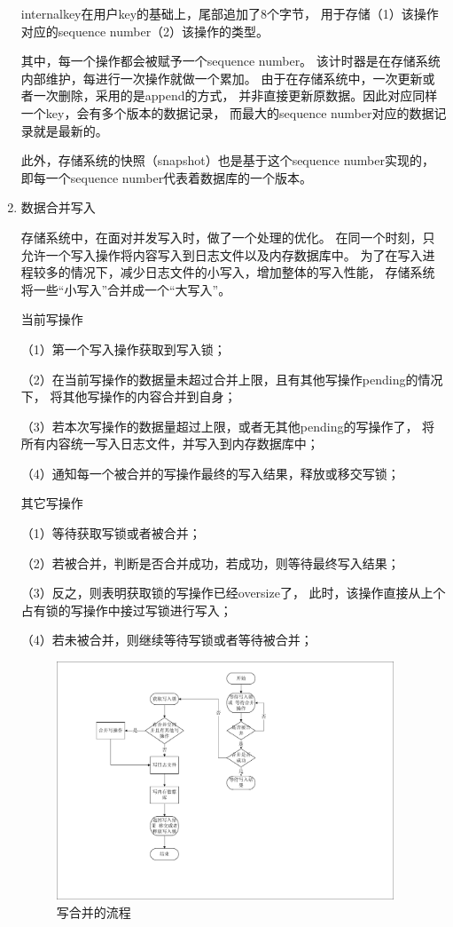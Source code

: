 \begin{enumerate}
		internalkey在用户key的基础上，尾部追加了8个字节，
		用于存储（1）该操作对应的sequence number（2）该操作的类型。

		其中，每一个操作都会被赋予一个sequence number。
		该计时器是在存储系统内部维护，每进行一次操作就做一个累加。
		由于在存储系统中，一次更新或者一次删除，采用的是append的方式，
		并非直接更新原数据。因此对应同样一个key，会有多个版本的数据记录，
		而最大的sequence number对应的数据记录就是最新的。

		此外，存储系统的快照（snapshot）也是基于这个sequence number实现的，
		即每一个sequence number代表着数据库的一个版本。

		\item 数据合并写入
		
		存储系统中，在面对并发写入时，做了一个处理的优化。
		在同一个时刻，只允许一个写入操作将内容写入到日志文件以及内存数据库中。
		为了在写入进程较多的情况下，减少日志文件的小写入，增加整体的写入性能，
		存储系统将一些“小写入”合并成一个“大写入”。

		当前写操作

		（1）第一个写入操作获取到写入锁；
		
		（2）在当前写操作的数据量未超过合并上限，且有其他写操作pending的情况下，
		将其他写操作的内容合并到自身；
		
		（3）若本次写操作的数据量超过上限，或者无其他pending的写操作了，
		将所有内容统一写入日志文件，并写入到内存数据库中；
		
		（4）通知每一个被合并的写操作最终的写入结果，释放或移交写锁；

		其它写操作

		（1）等待获取写锁或者被合并；
		
		（2）若被合并，判断是否合并成功，若成功，则等待最终写入结果；
		
		（3）反之，则表明获取锁的写操作已经oversize了，
		此时，该操作直接从上个占有锁的写操作中接过写锁进行写入；
		
		（4）若未被合并，则继续等待写锁或者等待被合并；

		\begin{figure}[H]
			\centering
			\includegraphics[width=0.95\textwidth]{pdf/write_merge.pdf}
			\caption{写合并的流程}
			\label{write_merge}
		\end{figure}


\end{enumerate}
